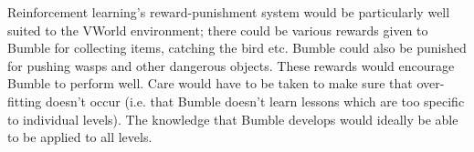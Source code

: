 \documentclass[a4paper,oneside]{report}
\begin{document}
Reinforcement learning's reward-punishment system would be particularly well suited to the VWorld environment; there could be various rewards given to Bumble for collecting items, catching the bird etc. Bumble could also be punished for pushing wasps and other dangerous objects. These rewards would encourage Bumble to perform well. Care would have to be taken to make sure that over-fitting doesn't occur (i.e. that Bumble doesn't learn lessons which are too specific to individual levels). The knowledge that Bumble develops would ideally be able to be applied to all levels.
		
\end{document}
